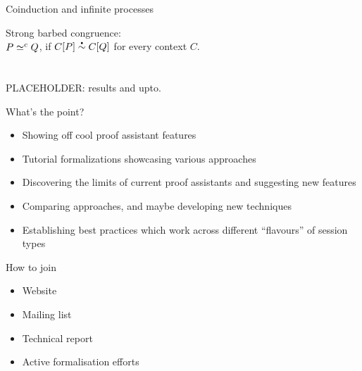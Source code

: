 \documentclass[aspectratio=169,hyperref={pdfpagelabels=false}]{beamer}
\begin{document}
\begin{frame}{Coinduction and infinite processes}

Strong barbed congruence:\\  
\textrm{
 \( P \simeq^c Q \), if \( \sbbisim{\applyctx{C}{P}}{\applyctx{C}{Q}} \) for every context \( C \).}
   \ \\ \ \\ \ \\

PLACEHOLDER: results and upto.

\end{frame}

\begin{frame}{What's the point?}
  \begin{itemize}
  \item Showing off cool proof assistant features
  \item Tutorial formalizations showcasing various approaches
  \item Discovering the limits of current proof assistants and suggesting new features
  \item Comparing approaches, and maybe developing new techniques
  \item Establishing best practices which work across different ``flavours'' of session types
  \end{itemize}
\end{frame}

\begin{frame}{How to join}
  \begin{itemize}
  \item Website
  \item Mailing list
  \item Technical report
  \item Active formalisation efforts
  \end{itemize}
\end{frame}
\end{document}
